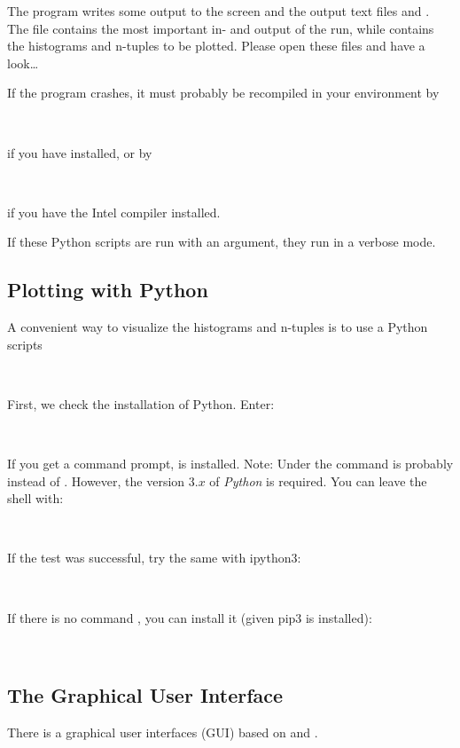 The program writes some output to the screen and the output text files
\wo and
\mhbe. The file \wo contains the most important
in- and output of the run, while \mhb contains the histograms and
n-tuples to be plotted. Please open these files and have a look{\ldots}

If the program crashes, it must probably be recompiled in your
environment by

~~~~~

if you have  installed, or by

~~~~~

if you have the Intel compiler  installed.

If these Python scripts are run with an argument, they run in a verbose mode.

\subsection{Plotting with Python}

A convenient way to visualize the histograms and
n-tuples is to use a Python scripts

~~~~~

First, we check the installation of Python. Enter:

~~~~~

If you get a  command prompt,  is
installed. Note: Under  the command is probably
 instead of . However, the version $3.x$ of {\it
Python} is required. You can leave the  shell with:

~~~~~

If the test was successful, try the same with ipython3:

~~~~~

If there is no command , you can install it (given pip3
is installed):

~~~~~

\subsection{The Graphical User Interface \WSH}

There is a graphical user interfaces (GUI) based on  and
.

